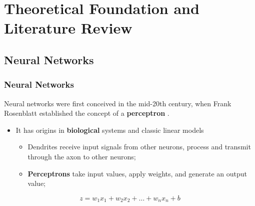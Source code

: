 \documentclass[aspectratio=169]{beamer}
\begin{document}

\section{Theoretical Foundation and Literature Review}

\subsection{Neural Networks}

\begin{frame}
\frametitle{Neural Networks}
\justifying
Neural networks were first conceived in the mid-20th century, when Frank Rosenblatt established the concept of a \textbf{perceptron} \cite{rosenblatt1958perceptron}.

\vspace{0.4cm}
\begin{itemize}
    \item It has origins in \textbf{biological} systems and classic linear models
    \begin{itemize}
        \item Dendrites receive input signals from other neurons, process and transmit through the axon to other neurons;
        \item \textbf{Perceptrons} take input values, apply weights, and generate an output value;  
    \end{itemize}
\end{itemize}

\begin{equation}
z = w_1 x_1 + w_2 x_2 + \dots + w_n x_n + b
\end{equation}

\end{frame}

\end{document}
